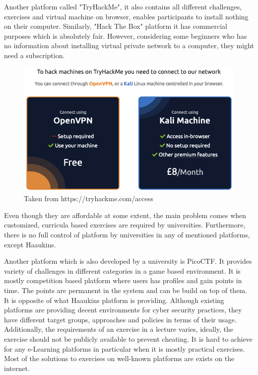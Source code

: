 Another platform called "TryHackMe", it also contains all different challenges, exercises and virtual machine on browser, enables participants to install nothing on their computer. Similarly, "Hack The Box" platform it has commercial purposes which is absolutely fair. However, considering some beginners who has no information about installing virtual private network to a computer, they might need a subscription. 

\begin{figure}[htbp]
\centerline{\includegraphics[scale=.5]{figures/try-hack-me.png}}
\caption{Taken from https://tryhackme.com/access}
\label{fig}
\end{figure}
 
 
Even though they are affordable at some extent, the main problem comes when customized, curricula based exercises are required by universities. Furthermore, there is no full control of platform by universities in any of mentioned platforms, except Haaukins. 

Another platform which is also developed by a university is PicoCTF\cite{183443}.
It provides variety of challenges in different categories in a game based environment. It is mostly competition based platform where users has profiles and gain points in time. The points are permanent in the system and can be build on top of them. It is opposite of what Haaukins platform is providing.
Although existing platforms are providing decent environments for cyber security practices, they have different target groups, approaches and policies in terms of their usage. Additionally, the requirements of an exercise in a lecture varies, ideally, the exercise should not be publicly available to prevent cheating. It is hard to achieve for any e-Learning platforms in particular when it is mostly practical exercises. Most of the solutions to exercises on well-known platforms are exists on the internet.


